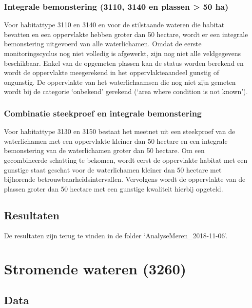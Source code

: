 \documentclass[twoside]{extreport}
\begin{document}
\subsection{Integrale bemonstering (3110, 3140 en plassen \textgreater{}
50 ha)}\label{integrale-bemonstering-3110-3140-en-plassen-50-ha}

Voor habitattype 3110 en 3140 en voor de stilstaande wateren die habitat
bevatten en een oppervlakte hebben groter dan 50 hectare, wordt er een
integrale bemonstering uitgevoerd van alle waterlichamen. Omdat de
eerste monitoringscyclus nog niet volledig is afgewerkt, zijn nog niet
alle veldgegevens beschikbaar. Enkel van de opgemeten plassen kan de
status worden berekend en wordt de oppervlakte meegerekend in het
oppervlakteaandeel gunstig of ongunstig. De oppervlakte van het
waterlichaamsen die nog niet zijn gemeten wordt bij de categorie
`onbekend' gerekend (`area where condition is not known').

\subsection{Combinatie steekproef en integrale
bemonstering}\label{combinatie-steekproef-en-integrale-bemonstering}

Voor habitattype 3130 en 3150 bestaat het meetnet uit een steekproef van
de waterlichamen met een oppervlakte kleiner dan 50 hectare en een
integrale bemonstering van de waterlichamen groter dan 50 hectare. Om
een gecombineerde schatting te bekomen, wordt eerst de oppervlakte
habitat met een gunstige staat geschat voor de waterlichamen kleiner dan
50 hectare met bijhorende betrouwbaarheidsintervallen. Vervolgens wordt
de oppervlakte van de plassen groter dan 50 hectare met een gunstige
kwaliteit hierbij opgeteld.

\section{Resultaten}\label{resultaten-5}

De resultaten zijn terug te vinden in de folder
`AnalyseMeren\_2018-11-06'.

\chapter{Stromende wateren (3260)}\label{h:rivieren}

\section{Data}\label{data-7}
\end{document}
